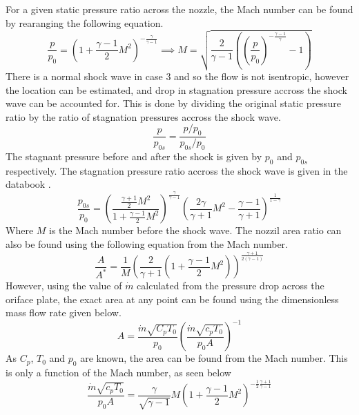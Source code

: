\documentclass{article}
\begin{document}
For a given static pressure ratio across the nozzle, the Mach number can be found by rearanging the following equation.
\begin{equation}
    \frac{p}{p_0} = \left( 1 + \frac{\gamma - 1}{2}M^2\right) ^ {-\frac{\gamma}{\gamma-1}} \implies M = \sqrt{\frac{2}{\gamma-1} \left( \left( \frac{p}{p_0}\right) ^ {-\frac{\gamma-1}{\gamma}} - 1\right)}
\end{equation}
There is a normal shock wave in case 3 and so the flow is not isentropic, however the location can be estimated, and drop in stagnation pressure accross the shock wave can be accounted for.
This is done by dividing the original static pressure ratio by the ratio of stagnation pressures accross the shock wave.
\begin{equation}
    \frac{p}{p_{0s}} = \frac{p/p_0}{p_{0s}/p_0}
\end{equation}
The stagnant pressure before and after the shock is given by $p_0$ and $p_{0s}$ respectively.
The stagnation pressure ratio accross the shock wave is given in the databook \cite{data_book}.
\begin{equation}
    \frac{p_{0s}}{p_0} = \left( \frac{\frac{\gamma+1}{2}M^2}{1 + \frac{\gamma-1}{2}M^2}\right) ^ \frac{\gamma}{\gamma-1} \left( \frac{2\gamma}{\gamma+1} M^2 - \frac{\gamma-1}{\gamma+1}\right) ^ \frac{1}{1 - \gamma}
\end{equation}
Where $M$ is the Mach number before the shock wave.
The nozzil area ratio can also be found using the following equation from the Mach number.
\begin{equation}
    \frac{A}{A^*} = \frac{1}{M} \left( \frac{2}{\gamma+1} \left( 1 + \frac{\gamma-1}{2}M^2\right) \right) ^ {\frac{\gamma+1}{2(\gamma-1)}}
\end{equation}
However, using the value of $\dot{m}$ calculated from the pressure drop across the oriface plate, the exact area at any point can be found using the dimensionless mass flow rate given below.
\begin{equation}
    A = \frac{\dot{m}\sqrt{C_pT_0}}{p_0} \left( \frac{\dot{m}\sqrt{c_pT_0}}{p_0A} \right)^{-1}
    \label{eqn:area}
\end{equation}
As $C_p$, $T_0$ and $p_0$ are known, the area can be found from the Mach number.
This is only a function of the Mach number, as seen below
\begin{equation}
    \frac{\dot{m}\sqrt{c_pT_0}}{p_0A} = \frac{\gamma}{\sqrt{\gamma-1}} M \left(1 + \frac{\gamma - 1}{2} M^2 \right) ^ {- \frac{1}{2}\frac{\gamma + 1}{\gamma - 1}} 
\end{equation}
\end{document}

